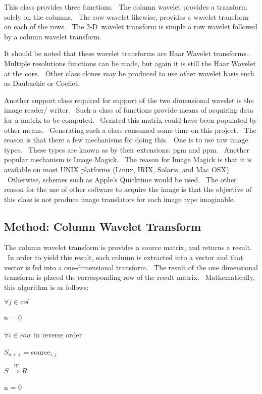 \documentclass{article}
\begin{document}
This class provides three functions. \ The column wavelet provides a
transform solely on the columns. \ The row wavelet likewise, provides a
wavelet transform on each of the rows. \ The 2-D\ wavelet transform is
simple a row wavelet followed by a column wavelet transform. \ 

It should be noted that these wavelet transforms are Haar Wavelet
transforms.. Multiple resolutions functions can be made, but again it is
still the Haar Wavelet at the core. \ Other class clones may be produced to
use other wavelet basis such as Daubachie or Coeflet. \ 

Another support class required for support of the two dimensional wavelet is
the image reader/ writer. \ Such a class of functions provide means of
acquiring data for a matrix to be computed. \ Granted this matrix could have
been populated by other means. \ Generating such a class consumed some time
on this project. \ The reason is that there a few mechanisms for doing this.
\ One is to use raw image types. \ These types are known as by their
extensions: pgm and ppm. \ Another popular mechanism is Image Magick. \ The
reason for Image Magick is that it is available on most UNIX platforms
(Linux, IRIX, Solaris, and Mac OSX). \ Otherwise, schemes such as Apple's
Quicktime would be used. \ The other reason for the use of other software to
acquire the image is that the objective of this class is not produce image
translators for each image type imaginable. \  

\subsection{\protect\bigskip Method: Column Wavelet Transform}

The column wavelet transform is provides a source matrix, and returns a
result. \ In order to yield this result, each column is extracted into a
vector and that vector is fed into a one-dimensional transform. \ The result
of the one dimensional transform is placed the corresponding row of the
result matrix. \ Mathematically, this algorithm is as follows:

\qquad $\forall j\in col$

\qquad \qquad n = 0

\qquad \qquad $\forall i\in row$ in reverse order

\qquad \qquad \qquad $S_{n++}=$source$_{i,j}$

\qquad \qquad $S$ $\overset{W}{\Rightarrow }R$

\qquad \qquad n = 0
\end{document}
